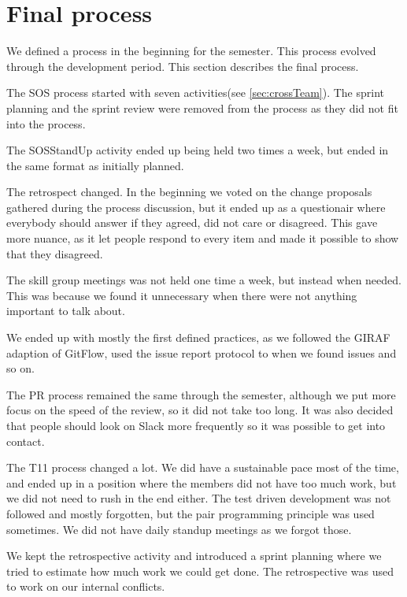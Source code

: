 \section{Final process}
We defined a process in the beginning for the semester. This process evolved through the development period. This section describes the final process. 

The \gls{SOS} process started with seven activities(see \ref{sec:crossTeam}). The sprint planning and the sprint review were removed from the process as they did not fit into the process. 

The \gls{SOSStandUp} activity ended up being held two times a week, but ended in the same format as initially planned. 

The retrospect changed. In the beginning we voted on the change proposals gathered during the process discussion, but it ended up as a questionair where everybody should answer if they agreed, did not care or disagreed. This gave more nuance, as it let people respond to every item and made it possible to show that they disagreed.

The skill group meetings was not held one time a week, but instead when needed. This was because we found it unnecessary when there were not anything important to talk about. 

We ended up with mostly the first defined practices, as we followed the GIRAF adaption of GitFlow, used the issue report protocol to when we found issues and so on. 

The PR process remained the same through the semester, although we put more focus on the speed of the review, so it did not take too long. It was also decided that people should look on Slack more frequently so it was possible to get into contact. 

The \gls{T11} process changed a lot. We did have a sustainable pace most of the time, and ended up in a position where the members did not have too much work, but we did not need to rush in the end either. The test driven development was not followed and mostly forgotten, but the pair programming principle was used sometimes. We did not have daily standup meetings as we forgot those. 

We kept the retrospective activity and introduced a sprint planning where we tried to estimate how much work we could get done. The retrospective was used to work on our internal conflicts. 